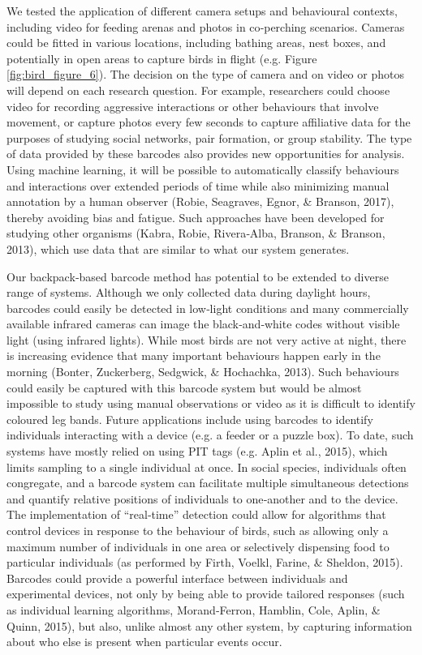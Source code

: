 \documentclass[11pt,a4paper,twoside]{book}
\begin{document}
\begin{doublespace}
We tested the application of different camera setups and behavioural contexts, including video for feeding arenas and photos in co‐perching scenarios. Cameras could be fitted in various locations, including bathing areas, nest boxes, and potentially in open areas to capture birds in flight (e.g. Figure \ref{fig:bird_figure_6}). The decision on the type of camera and on video or photos will depend on each research question. For example, researchers could choose video for recording aggressive interactions or other behaviours that involve movement, or capture photos every few seconds to capture affiliative data for the purposes of studying social networks, pair formation, or group stability. The type of data provided by these barcodes also provides new opportunities for analysis. Using machine learning, it will be possible to automatically classify behaviours and interactions over extended periods of time while also minimizing manual annotation by a human observer (Robie, Seagraves, Egnor, \& Branson, 2017), thereby avoiding bias and fatigue. Such approaches have been developed for studying other organisms (Kabra, Robie, Rivera‐Alba, Branson, \& Branson, 2013), which use data that are similar to what our system generates.

Our backpack‐based barcode method has potential to be extended to diverse range of systems. Although we only collected data during daylight hours, barcodes could easily be detected in low‐light conditions and many commercially available infrared cameras can image the black‐and‐white codes without visible light (using infrared lights). While most birds are not very active at night, there is increasing evidence that many important behaviours happen early in the morning (Bonter, Zuckerberg, Sedgwick, \& Hochachka, 2013). Such behaviours could easily be captured with this barcode system but would be almost impossible to study using manual observations or video as it is difficult to identify coloured leg bands. Future applications include using barcodes to identify individuals interacting with a device (e.g. a feeder or a puzzle box). To date, such systems have mostly relied on using PIT tags (e.g. Aplin et al., 2015), which limits sampling to a single individual at once. In social species, individuals often congregate, and a barcode system can facilitate multiple simultaneous detections and quantify relative positions of individuals to one‐another and to the device. The implementation of “real‐time” detection could allow for algorithms that control devices in response to the behaviour of birds, such as allowing only a maximum number of individuals in one area or selectively dispensing food to particular individuals (as performed by Firth, Voelkl, Farine, \& Sheldon, 2015). Barcodes could provide a powerful interface between individuals and experimental devices, not only by being able to provide tailored responses (such as individual learning algorithms, Morand‐Ferron, Hamblin, Cole, Aplin, \& Quinn, 2015), but also, unlike almost any other system, by capturing information about who else is present when particular events occur.


\end{doublespace}
\end{document}
